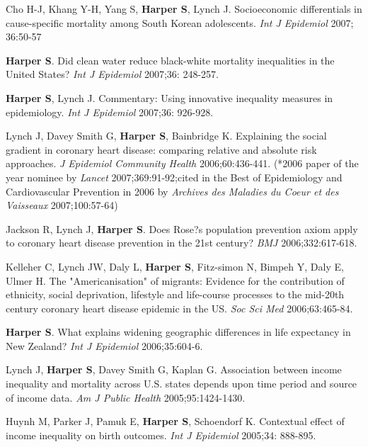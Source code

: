 \documentclass[
  letterpaper,
  DIV=11,
  numbers=noendperiod]{scrartcl}
\begin{document}
\begin{etaremune}
\item Cho H-J, Khang Y-H, Yang S, \textbf{Harper S}, Lynch J.  Socioeconomic differentials in cause-specific mortality among South Korean adolescents.  \emph{Int J Epidemiol} 2007; 36:50-57
 
\item \textbf{Harper S}. Did clean water reduce black-white mortality inequalities in the United States?  \emph{Int J Epidemiol} 2007;36: 248-257.
 
\item \textbf{Harper S}, Lynch J.  Commentary: Using innovative inequality measures in epidemiology.  \emph{Int J Epidemiol} 2007;36: 926-928.

\item Lynch J, Davey Smith G, \textbf{Harper S}, Bainbridge K.  Explaining the social gradient in coronary heart disease:  comparing relative and absolute risk approaches.  \emph{J Epidemiol Community Health} 2006;60:436-441. (*2006 paper of the year nominee by \emph{Lancet} 2007;369:91-92;cited in the Best of Epidemiology and Cardiovascular Prevention in 2006 by \emph{Archives des Maladies du Coeur et des Vaisseaux} 2007;100:57-64)
 
\item Jackson R, Lynch J, \textbf{Harper S}.  Does Rose?s population prevention axiom apply to coronary heart disease prevention in the 21st century?  \emph{BMJ} 2006;332:617-618.
 
\item Kelleher C, Lynch JW, Daly L, \textbf{Harper S}, Fitz-simon N, Bimpeh Y, Daly E, Ulmer H. The "Americanisation" of migrants: Evidence for the contribution of ethnicity, social deprivation, lifestyle and life-course processes to the mid-20th century coronary heart disease epidemic in the US.  \emph{Soc Sci Med} 2006;63:465-84.
 
\item \textbf{Harper S}. What explains widening geographic differences in life expectancy in New Zealand?  \emph{Int J Epidemiol} 2006;35:604-6.

\item Lynch J, \textbf{Harper S}, Davey Smith G, Kaplan G. Association between income inequality and mortality across U.S. states depends upon time period and source of income data.  \emph{Am J Public Health} 2005;95:1424-1430.
 
\item Huynh M, Parker J, Pamuk E, \textbf{Harper S}, Schoendorf K. Contextual effect of income inequality on birth outcomes.  \emph{Int J Epidemiol} 2005;34: 888-895. 
 

\end{etaremune}
\end{document}
